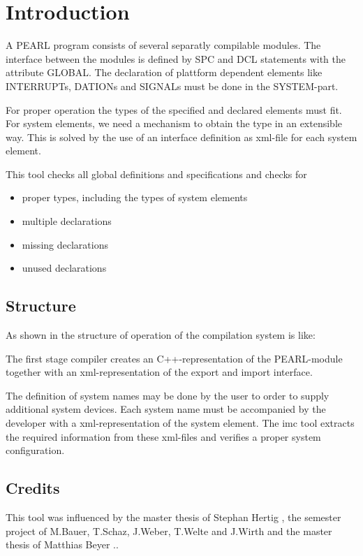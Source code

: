 \chapter{Introduction}
A PEARL program consists of several separatly compilable modules.
The interface between the modules is defined by SPC and DCL statements with the
attribute GLOBAL.
The declaration of plattform dependent elements like INTERRUPTs, 
DATIONs and SIGNALs must be done in the SYSTEM-part.

For proper operation the types of the specified and declared elements must
fit. 
For system elements, we need a mechanism to obtain the type in an
extensible way. This is solved by the use of an interface definition as 
xml-file for each system element.

This tool checks all global definitions and specifications and checks for
\begin{itemize}
\item proper types, including the types of system elements
\item multiple declarations
\item missing declarations
\item unused declarations
\end{itemize}

\section{Structure}
As shown in \cite{mueller2016} the structure of operation of the \OpenPEARL{}
compilation system is like:


The first stage compiler creates an C++-representation of the PEARL-module
together with an xml-representation of the export and import interface.

The definition of system names may be done by the user to order to supply 
additional system devices.
Each system name must be accompanied by the developer with a xml-representation
of the system element. The imc tool extracts the required information
from these xml-files and verifies a proper system configuration.

\section{Credits}
This tool  was influenced by the master thesis of 
Stephan Hertig \cite{msc_hertwig}, the semester project of
M.Bauer, T.Schaz, J.Weber, T.Welte and J.Wirth \cite{openpearlss16}
and the master thesis of Matthias Beyer \cite{msc_beyer}..


